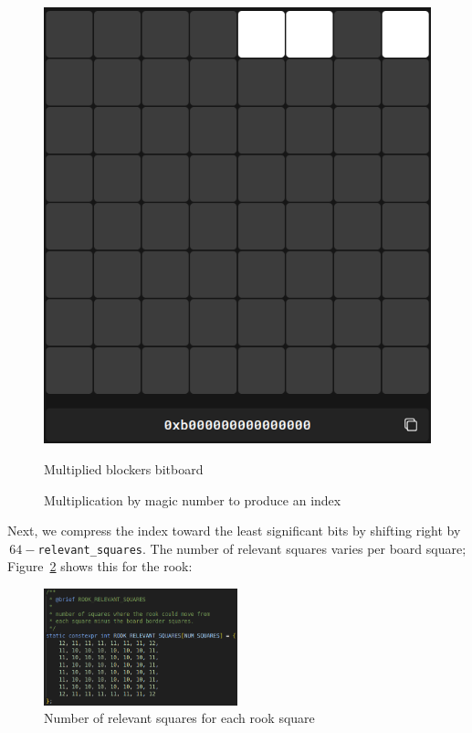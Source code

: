 \begin{figure}[H]
\begin{minipage}[c]{0.4\textwidth}
        \includegraphics[width=\textwidth]{Imagenes/magics_multiplied_blockers.png}
        \caption*{Multiplied blockers bitboard}
    \end{minipage}
    \caption{Multiplication by magic number to produce an index}
    \label{fig:magic_multiplication}
\end{figure}

\noindent Next, we compress the index toward the least significant bits by shifting right by \(\,64-\)\texttt{relevant\_squares}. The number of relevant squares varies per board square; Figure~\ref{fig:magics_relevant_squares} shows this for the rook:

\begin{figure}[H]
    \centering
    \includegraphics[width=0.5\textwidth]{Imagenes/magics_relevant_squares.png}
    \caption{Number of relevant squares for each rook square}
    \label{fig:magics_relevant_squares}
\end{figure}

